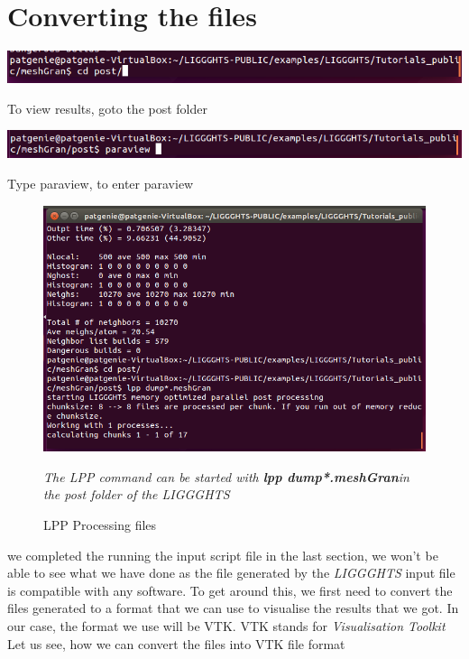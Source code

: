 \documentclass{tufte-book} %
\newcommand{\Li}{\textit{LIGGGHTS}\xspace}
\begin{document}
 \section[Converting the files]{Converting the files}
 \begin{marginfigure}
   \includegraphics[width=\linewidth]{graphics/Screenshot/Con1.png}
   \caption{To view results, goto the post folder}
  
   \includegraphics[width=\linewidth]{graphics/Screenshot/Con4.png}
   \caption{Type paraview, to enter paraview}
 \end{marginfigure}
 \begin{figure}
 \includegraphics[width=\linewidth]{graphics/Screenshot/Con2.png}
 \caption{LPP Processing files}
 \textit{The LPP command can be started with \textbf{lpp dump*.meshGran}in the post folder of the \Li}
 \end{figure}
 \begin{fullwidth}
    we completed the running the input script file in the last section, we won't be able to see what we have done as the file generated by the \Li input file is compatible with any software. To get around this, we first need to convert the files generated to a format that we can use to visualise the results that we got. In our case, the format we use will be VTK. VTK stands for \textit{Visualisation Toolkit}
   Let us see, how we can convert the files into VTK file format
 \end{fullwidth}
\end{document}
